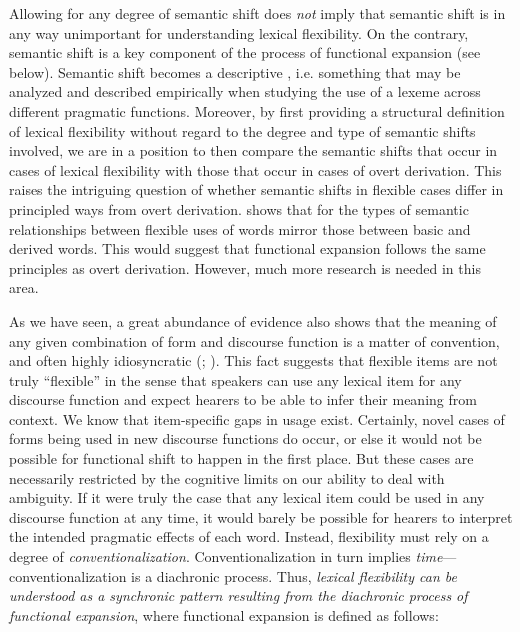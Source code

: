 Allowing for any degree of semantic shift does \emph{not} imply that semantic shift is in any way unimportant for understanding lexical flexibility. On the contrary, semantic shift is a key component of the process of functional expansion (see below). Semantic shift becomes a descriptive , i.e. something that may be analyzed and described empirically when studying the use of a lexeme across different pragmatic functions. Moreover, by first providing a structural definition of lexical flexibility without regard to the degree and type of semantic shifts involved, we are in a position to then compare the semantic shifts that occur in cases of lexical flexibility with those that occur in cases of overt derivation. This raises the intriguing question of whether semantic shifts in flexible cases differ in principled ways from overt derivation. \textcite[165]{Mithun2017} shows that for  the types of semantic relationships between flexible uses of words mirror those between basic and derived words. This would suggest that functional expansion follows the same principles as overt derivation. However, much more research is needed in this area.

As we have seen, a great abundance of evidence also shows that the meaning of any given combination of form and discourse function is a matter of convention, and often highly idiosyncratic (; ). This fact suggests that flexible items are not truly \enquote{flexible} in the sense that speakers can use any lexical item for any discourse function and expect hearers to be able to infer their meaning from context. We know that item-specific gaps in usage exist. Certainly, novel cases of forms being used in new discourse functions do occur, or else it would not be possible for functional shift to happen in the first place. But these cases are necessarily restricted by the cognitive limits on our ability to deal with ambiguity. If it were truly the case that any lexical item could be used in any discourse function at any time, it would barely be possible for hearers to interpret the intended pragmatic effects of each word. Instead, flexibility must rely on a degree of \emph{conventionalization}. Conventionalization in turn implies \emph{time}—conventionalization is a diachronic process. Thus, \emph{lexical flexibility can be understood as a synchronic pattern resulting from the diachronic process of functional expansion}, where functional expansion is defined as follows:

